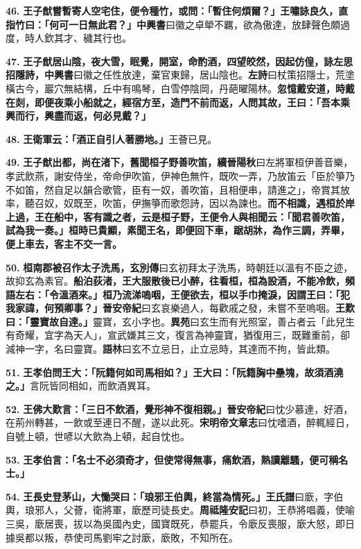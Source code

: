 \textbf{46.} \textbf{王子猷嘗暫寄人空宅住，便令種竹，或問：「暫住何煩爾？」王嘯詠良久，直指竹曰：「何可一日無此君？」}{\footnotesize \textbf{中興書}曰徽之卓犖不羈，欲為傲達，放肆聲色頗過度，時人欽其才、穢其行也。}

\textbf{47.} \textbf{王子猷居山陰，夜大雪，眠覺，開室，命酌酒，四望皎然，因起仿偟，詠左思招隱詩，}{\footnotesize \textbf{中興書}曰徽之任性放達，棄官東歸，居山陰也。\textbf{左詩}曰杖策招隱士，荒塗橫古今，巖穴無結構，丘中有鳴琴，白雪停陰岡，丹葩曜陽林。}\textbf{忽憶戴安道，時戴在剡，即便夜乘小船就之，經宿方至，造門不前而返，人問其故，王曰：「吾本乘興而行，興盡而返，何必見戴？」}

\textbf{48.} \textbf{王衛軍云：「酒正自引人著勝地。」}{\footnotesize 王薈已見。}

\textbf{49.} \textbf{王子猷出都，尚在渚下，舊聞桓子野善吹笛，}{\footnotesize \textbf{續晉陽秋}曰左將軍桓伊善音樂，孝武飲燕，謝安侍坐，帝命伊吹笛，伊神色無忤，既吹一弄，乃放笛云「臣於箏乃不如笛，然自足以韻合歌管，臣有一奴，善吹笛，且相便串，請進之」，帝賞其放率，聽召奴，奴既至，吹笛，伊撫箏而歌怨詩，因以為諫也。}\textbf{而不相識，遇桓於岸上過，王在船中，客有識之者，云是桓子野，王便令人與相聞云：「聞君善吹笛，試為我一奏。」桓時已貴顯，素聞王名，即便回下車，踞胡牀，為作三調，弄畢，便上車去，客主不交一言。}

\textbf{50.} \textbf{桓南郡被召作太子洗馬，}{\footnotesize \textbf{玄別傳}曰玄初拜太子洗馬，時朝廷以溫有不臣之迹，故抑玄為素官。}\textbf{船泊荻渚，王大服散後已小醉，往看桓，桓為設酒，不能冷飲，頻語左右：「令溫酒來。」桓乃流涕嗚咽，王便欲去，桓以手巾掩淚，因謂王曰：「犯我家諱，何預卿事？」}{\footnotesize \textbf{晉安帝紀}曰玄哀樂過人，每歡戚之發，未嘗不至嗚咽。}\textbf{王歎曰：「靈寶故自達。」}{\footnotesize 靈寶，玄小字也。\textbf{異苑}曰玄生而有光照室，善占者云「此兒生有奇耀，宜字為天人」，宣武嫌其三文，復言為神靈寶，猶復用三，既難重前，卻減神一字，名曰靈寶。\textbf{語林}曰玄不立忌日，止立忌時，其達而不拘，皆此類。}

\textbf{51.} \textbf{王孝伯問王大：「阮籍何如司馬相如？」王大曰：「阮籍胸中壘塊，故須酒澆之。」}{\footnotesize 言阮皆同相如，而飲酒異耳。}

\textbf{52.} \textbf{王佛大歎言：「三日不飲酒，覺形神不復相親。」}{\footnotesize \textbf{晉安帝紀}曰忱少慕達，好酒，在荊州轉甚，一飲或至連日不醒，遂以此死。\textbf{宋明帝文章志}曰忱嗜酒，醉輒經日，自號上頓，世喭以大飲為上頓，起自忱也。}

\textbf{53.} \textbf{王孝伯言：「名士不必須奇才，但使常得無事，痛飲酒，熟讀離騷，便可稱名士。」}

\textbf{54.} \textbf{王長史登茅山，大慟哭曰：「琅邪王伯輿，終當為情死。」}{\footnotesize \textbf{王氏譜}曰廞，字伯輿，琅邪人，父薈，衛將軍，廞歷司徒長史。\textbf{周祗隆安記}曰初，王恭將唱義，使喻三吳，廞居喪，拔以為吳國內史，國寶既死，恭罷兵，令廞反喪服，廞大怒，即日據吳都以叛，恭使司馬劉牢之討廞，廞敗，不知所在。}